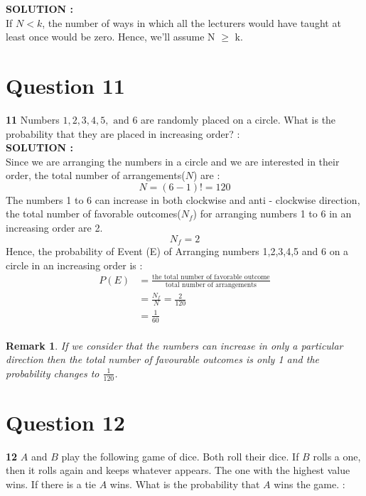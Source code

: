 \documentclass{article}
\newtheorem*{remark}{Remark}
\begin{document}
\hspace{1em} \large{\textbf{SOLUTION :}} \\

    If $N < k$, the number of ways in which all the lecturers would have taught at least once would be zero. Hence, we’ll assume N $\geq$ k.


\section{Question 11}
\label{Q11}
\textbf{11} Numbers $1, 2, 3, 4, 5, \text{ and } 6$ are randomly placed on a circle. What is the probability that they are placed in increasing order?  : \\

\hspace{1em} \large{\textbf{SOLUTION :}} \\
Since we are arranging the numbers in a circle and we are interested in their order, the total number of arrangements($N$) are :
$$ N = (6-1)! = 120$$
The numbers 1 to 6 can increase in both clockwise and anti - clockwise direction, the total number of favorable outcomes($N_f$) for arranging numbers 1 to 6 in an increasing order are 2.
$$ N_f  = 2 $$
Hence, the probability of Event (E) of Arranging numbers 1,2,3,4,5 and 6 on a circle in an increasing order is :
\begin{align*}
	P(E) &= \frac{\text{the total number of favorable outcome}}{\text{total number of arrangements}} \\
	&= \frac{N_f}{N} = \frac{2}{120} \\
	&= \frac{1}{60} \\
\end{align*}
\begin{remark}
If we consider that the numbers can increase in only a particular direction then the total number of favourable outcomes is only 1 and the probability changes to $\frac{1}{120}$.
\end{remark}
\section{Question 12}
\label{Q12}
\textbf{12} $A$ and $B$ play the following game of dice. Both roll their dice. If $B$ rolls a one, then it rolls again and keeps whatever appears. The one with the highest value wins. If there is a tie $A$ wins. What is the probability that $A$ wins the game. : \\
\end{document}
